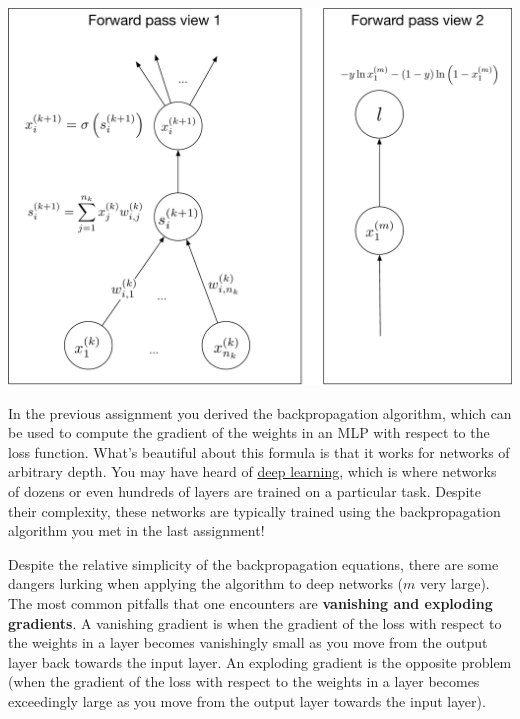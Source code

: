 \documentclass[assignment07_Solutions]{subfiles}
\begin{document}
\begin{recall}
\begin{center}
\includegraphics[width=0.7\linewidth]{figures/mlpfullforward}
\end{center}

\end{recall}

In the previous assignment you derived the backpropagation algorithm, which can be used to compute the gradient of the weights in an MLP with respect to the loss function.  What's beautiful about this formula is that it works for networks of arbitrary depth.  You may have heard of \href{https://en.wikipedia.org/wiki/Deep_learning}{deep learning}, which is where networks of dozens or even hundreds of layers are trained on a particular task.  Despite their complexity, these networks are typically trained using the backpropagation algorithm you met in the last assignment!

Despite the relative simplicity of the backpropagation equations, there are some dangers lurking when applying the algorithm to deep networks ($m$ very large).  The most common pitfalls that one encounters are \textbf{vanishing and exploding gradients}.  A vanishing gradient is when the gradient of the loss with respect to the weights in a layer becomes vanishingly small as you move from the output layer back towards the input layer.  An exploding gradient is the opposite problem (when the gradient of the loss with respect to the weights in a layer becomes exceedingly large as you move from the output layer towards the input layer).
\end{document}
